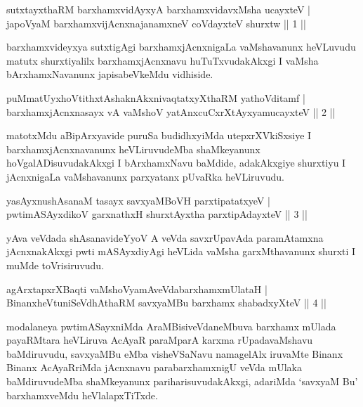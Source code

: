 
\centerline{}

\begin{shl}
sutxtayxthaRM barxhamxvidAyxyA barxhamxvidavxMsha ucayxteV |\\
japoV\s yaM barxhamxvijAcnxnajanamxneV coVdayxteV shurxtw \hfill || 1 ||
\end{shl}

\begin{artha}
barxhamxvideyxya sutxtigAgi barxhamxjAcnxnigaLa vaMshavanunx heVLuvudu matutx shurxtiyalilx barxhamxjAcnxnavu huTuTxvudakAkxgi I vaMsha bArxhamxNavanunx japisabeVkeMdu vidhiside.
\end{artha}

\begin{shl}
puMmatUyxhoVtithxtAshaknAkxnivaqtatxyXthaRM yathoVditamf |\\
barxhamxjAcnxnasayx vA vaMshoV yatAnxcuCxrXtAyx\s yamucayxteV \hfill || 2 ||
\end{shl}

\begin{artha}
matotxMdu aBipArxyavide puruSa budidhxyiMda utepxrXVkiSxsiye I barxhamxjAcnxnavanunx heVLiruvudeMba shaMkeyanunx hoVgalADisuvudakAkxgi I bArxhamxNavu baMdide, adakAkxgiye shurxtiyu I jAcnxnigaLa vaMshavanunx parxyatanx pUvaRka heVLiruvudu.
\end{artha}


\begin{shl}
yasAyxnushAsanaM tasayx savxyaMBoVH parxtipatatxyeV |\\
pwtimASAyxdikoV garxnathxH shurxtAyx\s tha parxtipAdayxteV \hfill || 3 ||
\end{shl}

\begin{artha}
yAva veVdada shAsanavideYyoV A veVda savxrUpavAda paramAtamxna jAcnxnakAkxgi pwti mASAyxdiyAgi heVLida vaMsha garxMthavanunx shurxti I muMde toVrisiruvudu.
\end{artha}

\begin{shl}
agArxtapxrXBaqti vaMshoV\s yamAveVdabarxhamxmUlataH |\\
BinanxheVtuniSeVdhAthaRM savxyaMBu barxhamx shabadxyXteV \hfill || 4 ||
\end{shl}

\begin{artha}
modalaneya pwtimASayxniMda AraMBisiveVdaneMbuva barxhamx mUlada
 payaRMtara heVLiruva AcAyaR paraMparA karxma rUpadavaMshavu
baMdiruvudu, savxyaMBu eMba visheVSaNavu namagelAlx iruvaMte Binanx
Binanx AcAyaRriMda jAcnxnavu parabarxhamxnigU veVda mUlaka
baMdiruvudeMba shaMkeyanunx pariharisuvudakAkxgi, adariMda `savxyaM Bu'
barxhamxveMdu heVlalapxTiTxde.
\end{artha}

